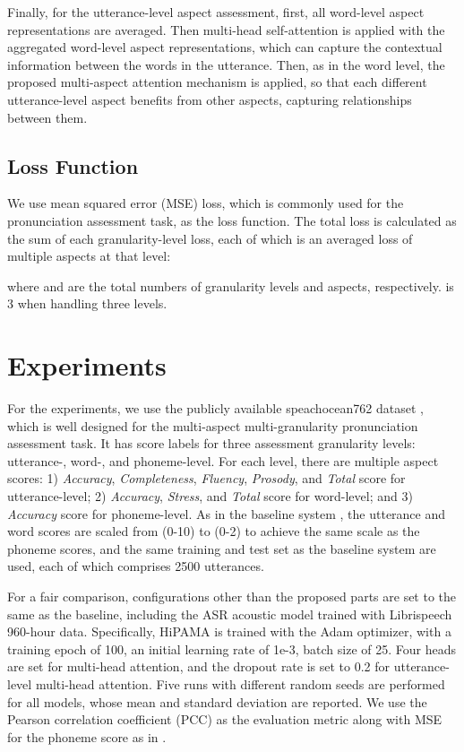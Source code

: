 \documentclass{article}
\begin{document}
Finally, for the utterance-level aspect assessment, first, all word-level aspect representations are averaged. Then multi-head self-attention is applied with the aggregated word-level aspect representations, which can capture the contextual information between the words in the utterance. Then, as in the word level, the proposed multi-aspect attention mechanism is applied, so that each different utterance-level aspect benefits from other aspects, capturing relationships between them.

\subsection{Loss Function}
We use mean squared error (MSE) loss, which is commonly used for the pronunciation assessment task, as the loss function. The total loss is calculated as the sum of each granularity-level loss, each of which is an averaged loss of multiple aspects at that level:
\begin{small}\end{small}
where  and  are the total numbers of granularity levels and aspects, respectively.  is 3 when handling three levels.

\section{Experiments}
For the experiments, we use the publicly available speachocean762 dataset \cite{zhang2021speechocean762}, which is well designed for the multi-aspect multi-granularity pronunciation assessment task. It has score labels for three assessment granularity levels: utterance-, word-, and phoneme-level. For each level, there are multiple aspect scores: 1) \textit{Accuracy}, \textit{Completeness}, \textit{Fluency}, \textit{Prosody}, and \textit{Total} score for utterance-level; 2) \textit{Accuracy}, \textit{Stress}, and \textit{Total} score for word-level; and 3) \textit{Accuracy} score for phoneme-level. As in the baseline system \cite{gong2022transformer}, the utterance and word scores are scaled from (0-10) to (0-2) to achieve the same scale as the phoneme scores, and the same training and test set as the baseline system are used, each of which comprises 2500 utterances.

For a fair comparison, configurations other than the proposed parts are set to the same as the baseline, including the ASR acoustic model trained with Librispeech \cite{panayotov2015librispeech} 960-hour data. Specifically, HiPAMA is trained with the Adam optimizer, with a training epoch of 100, an initial learning rate of 1e-3, batch size of 25. Four heads are set for multi-head attention, and the dropout rate is set to 0.2 for utterance-level multi-head attention. Five runs with different random seeds are performed for all models, whose mean and standard deviation are reported. We use the Pearson correlation coefficient (PCC) as the evaluation metric along with MSE for the phoneme score as in \cite{gong2022transformer}.
\end{document}
